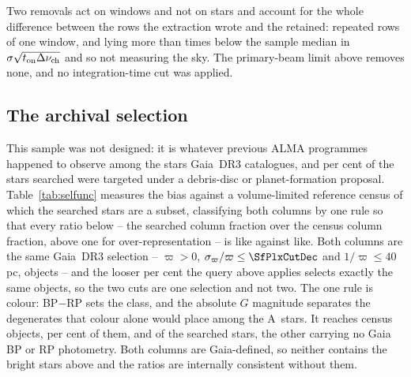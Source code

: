 Two removals act on windows and not on stars and account for the whole
difference between the \LqNExport{} rows the extraction wrote and the
\NWindows{} retained: \NDup{} repeated rows of one window, and \NDefect{}
lying more than \LqDefectCut{} times below the sample median in
$\sigma\sqrt{t_{\rm on}\Delta\nu_{\rm ch}}$ and so not measuring the sky. The
primary-beam limit above removes none, and no integration-time cut was
applied.

\subsection{The archival selection}
\label{sec:bias}

This sample was not designed: it is whatever previous ALMA programmes
happened to observe among the stars Gaia~DR3 catalogues, and
\PctDiscProposal{} per cent of the stars searched were targeted under a
debris-disc or planet-formation proposal. Table~\ref{tab:selfunc} measures
the bias against a volume-limited reference census of which the searched
stars are a subset, classifying both columns by one rule so that every ratio
below -- the searched column fraction over the census column fraction, above
one for over-representation -- is like against like. Both columns are the
same Gaia~DR3 selection --
$\varpi>0$, $\sigma_\varpi/\varpi\le\SfPlxCutDec$ and $1/\varpi\le40$\,pc,
\SfCensusN{} objects -- and the looser \PlxAdqlPct{} per cent the query above
applies selects exactly the same objects, so the two cuts are one selection
and not two. The one rule is colour: BP$-$RP sets the class, and the absolute
$G$ magnitude separates the degenerates that colour alone would place among
the A~stars. It reaches \SfCensusNCol{} census objects, \SfCensusColPct{} per
cent of them, and \SfNClassified{} of the \SfNStar{} searched stars, the
other \SfNNoColour{} carrying no Gaia BP or RP photometry. Both columns are
Gaia-defined, so neither contains the bright stars above and the ratios are
internally consistent without them.

